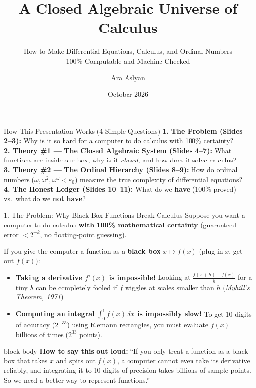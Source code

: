 \documentclass[aspectratio=169,11pt]{beamer}
\title[A Closed Algebraic Universe of Calculus]{A Closed Algebraic Universe of Calculus}
\subtitle{How to Make Differential Equations, Calculus, and Ordinal Numbers\\100\% Computable and Machine-Checked}
\author{Ara Aslyan}
\institute{Plain-English Presentation Plan \& Annotated Slides (Mechanized in Lean 4)}
\date{October 2026}
\newcommand{\say}[1]{%
  \vfill
  \begin{beamercolorbox}[sep=5pt,rounded=true,shadow=false]{block body}
  {\footnotesize \textbf{\textcolor{deepblue}{How to say this out loud:}} ``#1''}
  \end{beamercolorbox}
}
\begin{document}
\begin{frame}
  \titlepage
  \vspace{-0.3cm}
  \begin{block}{How This Presentation Works (4 Simple Questions)}
    \footnotesize
    \textbf{1. The Problem (Slides 2--3):} Why is it so hard for a computer to do calculus with 100\% certainty?\\
    \textbf{2. Theory \#1 --- The Closed Algebraic System (Slides 4--7):} What functions are inside our box, why is it \emph{closed}, and how does it solve calculus?\\
    \textbf{3. Theory \#2 --- The Ordinal Hierarchy (Slides 8--9):} How do ordinal numbers ($\omega, \omega^2, \omega^\omega < \varepsilon_0$) measure the true complexity of differential equations?\\
    \textbf{4. The Honest Ledger (Slides 10--11):} What do we \textbf{have} (100\% proved) vs.\ what do we \textbf{not have}?
  \end{block}
\end{frame}

\begin{frame}[shrink=6]{1. The Problem: Why Black-Box Functions Break Calculus}
  Suppose you want a computer to do calculus \textbf{with 100\% mathematical certainty} (guaranteed error $< 2^{-k}$, no floating-point guessing).

  \vspace{0.15cm}
  If you give the computer a function as a \textbf{black box} $x \mapsto f(x)$ (plug in $x$, get out $f(x)$):
  \begin{itemize}
    \item \textbf{Taking a derivative $f'(x)$ is impossible!}
      Looking at $\frac{f(x+h) - f(x)}{h}$ for a tiny $h$ can be completely fooled if $f$ wiggles at scales smaller than $h$ (\emph{Myhill's Theorem, 1971}).
    \item \textbf{Computing an integral $\int_0^1 f(x)\,dx$ is impossibly slow!}
      To get 10 digits of accuracy ($2^{-33}$) using Riemann rectangles, you must evaluate $f(x)$ \alert{billions of times ($2^{33}$ points)}.
  \end{itemize}

  \say{If you only treat a function as a black box that takes $x$ and spits out $f(x)$, a computer cannot even take its derivative reliably, and integrating it to 10 digits of precision takes billions of sample points. So we need a better way to represent functions.}
\end{frame}
\end{document}
